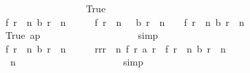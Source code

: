 \begin{isabellebody}
\ \ \ \ \ \ \ \ \ \ \ \ \ \ \ \ \isamarkupfalse%
\ True\isanewline
\ \ \ \ \ \ \ \ \ \ \ \ \ \ \ \ \isamarkupfalse%
\ {\isachardoublequoteopen}f\ {\isacharparenleft}r{}\ {\isacharplus}\ n{\isacharparenright}\ {\isacharparenleft}b\ {\isacharparenleft}r{}\ {\isacharplus}\ n\ {\isacharminus}\ {}{\isacharparenright}\ {\isacharplus}\ {}{\isacharparenright}\ {\isacharequal}\ f\ {\isacharparenleft}r{}\ {\isacharplus}\ n\ {\isacharminus}\ {}{\isacharparenright}\ {\isacharparenleft}b\ {\isacharparenleft}r{}\ {\isacharplus}\ n\ {\isacharminus}\ {}{\isacharparenright}{\isacharparenright}\ {\isacharplus}\ f\ {\isacharparenleft}r{}\ {\isacharplus}\ n{\isacharparenright}\ {\isacharparenleft}b\ {\isacharparenleft}r{}\ {\isacharplus}\ n\ {\isacharminus}\ {}{\isacharparenright}{\isacharparenright}{\isachardoublequoteclose}\isanewline
\ \ \ \ \ \ \ \ \ \ \ \ \ \ \ \ \ \ \isamarkupfalse%
\ True\ ap\isanewline
\ \ \ \ \ \ \ \ \ \ \ \ \ \ \ \ \ \ \isamarkupfalse%
\ simp\isanewline
\ \ \ \ \ \ \ \ \ \ \ \ \ \ \ \ \isamarkupfalse%
\ {\isachardoublequoteopen}f\ {\isacharparenleft}r{}\ {\isacharplus}\ n{\isacharparenright}\ {\isacharparenleft}b\ {\isacharparenleft}r{}\ {\isacharplus}\ n\ {\isacharminus}\ {}{\isacharparenright}\ {\isacharplus}\ {}{\isacharparenright}\ {\isacharequal}\ {\isacharparenleft}{\isacharparenleft}{\isasymSum}r{\isacharprime}{\isasymleftarrow}{\isacharbrackleft}r{}{\isachardot}{\isachardot}{\isacharless}r{}\ {\isacharplus}\ n{\isacharbrackright}{\isachardot}\ f\ r{\isacharprime}\ {\isacharparenleft}a\ r{\isacharprime}{\isacharparenright}{\isacharparenright}{\isacharparenright}\ {\isacharplus}\ f\ {\isacharparenleft}r{}\ {\isacharplus}\ n{\isacharparenright}\ {\isacharparenleft}b\ {\isacharparenleft}r{}\ {\isacharplus}\ n\ {\isacharminus}\ {}{\isacharparenright}{\isacharparenright}{\isachardoublequoteclose}\isanewline
\ \ \ \ \ \ \ \ \ \ \ \ \ \ \ \ \ \ \isamarkupfalse%
\ {\isacharasterisk}{\isacharparenleft}{}{\isacharparenright}\ {\isacharbackquoteopen}n\ {\isasymnoteq}\ {}{\isacharbackquoteclose}\isanewline
\ \ \ \ \ \ \ \ \ \ \ \ \ \ \ \ \ \ \isamarkupfalse%
\ simp\isanewline
\ \ \ \ \ \ \ \ \ \ \ \ \ \ \ \ \isamarkupfalse%
\ \isamarkupfalse%

\end{isabellebody}
